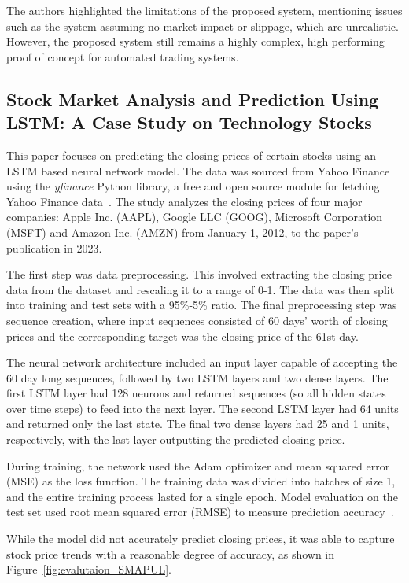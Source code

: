 \documentclass[a4paper,oneside,onecolumn,12pt]{book}
\begin{document}
	The authors highlighted the limitations of the proposed system, mentioning issues such as the system assuming no market impact or slippage, which are unrealistic. However, the proposed system still remains a highly complex, high performing proof of concept for automated trading systems.

	\subsection{Stock Market Analysis and Prediction Using LSTM: A Case Study on Technology Stocks~\cite{LiYuXuLiuMo2023}}
	This paper focuses on predicting the closing prices of certain stocks using an LSTM based neural network model. The data was sourced from Yahoo Finance using the \textit{yfinance} Python library, a free and open source module for fetching Yahoo Finance data~\cite{yfinance}. The study analyzes the closing prices of four major companies: Apple Inc. (AAPL), Google LLC (GOOG), Microsoft Corporation (MSFT) and Amazon Inc. (AMZN) from January 1, 2012, to the paper's publication in 2023.

	The first step was data preprocessing. This involved extracting the closing price data from the dataset and rescaling it to a range of 0-1. The data was then split into training and test sets with a 95\%-5\% ratio. The final preprocessing step was sequence creation, where input sequences consisted of 60 days' worth of closing prices and the corresponding target was the closing price of the 61st day.

	The neural network architecture included an input layer capable of accepting the 60 day long sequences, followed by two LSTM layers and two dense layers. The first LSTM layer had 128 neurons and returned sequences (so all hidden states over time steps) to feed into the next layer. The second LSTM layer had 64 units and returned only the last state. The final two dense layers had 25 and 1 units, respectively, with the last layer outputting the predicted closing price.

	During training, the network used the Adam optimizer and mean squared error (MSE) as the loss function. The training data was divided into batches of size 1, and the entire training process lasted for a single epoch. Model evaluation on the test set used root mean squared error (RMSE) to measure prediction accuracy~\cite{LiYuXuLiuMo2023}.

	While the model did not accurately predict closing prices, it was able to capture stock price trends with a reasonable degree of accuracy, as shown in Figure~\ref{fig:evalutaion_SMAPUL}.
	
\end{document}
